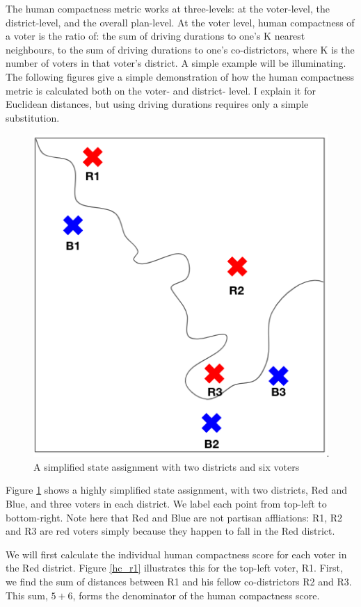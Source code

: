 \documentclass[]{article}
\begin{document}
The human compactness metric works at three-levels: at the voter-level,
the district-level, and the overall plan-level. At the voter level,
human compactness of a voter is the ratio of: the sum of driving
durations to one's K nearest neighbours, to the sum of driving durations
to one's co-districtors, where K is the number of voters in that voter's
district. A simple example will be illuminating. The following figures
give a simple demonstration of how the human compactness metric is
calculated both on the voter- and district- level. I explain it for
Euclidean distances, but using driving durations requires only a simple
substitution.

\begin{figure}
\centering
\includegraphics{img/human_compactness_1.png}
\caption{A simplified state assignment with two districts and six voters
\label{hc_demo}}
\end{figure}

Figure \ref{hc_demo} shows a highly simplified state assignment, with
two districts, Red and Blue, and three voters in each district. We label
each point from top-left to bottom-right. Note here that Red and Blue
are not partisan affliations: R1, R2 and R3 are red voters simply
because they happen to fall in the Red district.

We will first calculate the individual human compactness score for each
voter in the Red district. Figure \ref{hc_r1} illustrates this for the
top-left voter, R1. First, we find the sum of distances between R1 and
his fellow co-districtors R2 and R3. This sum, \(5 + 6\), forms the
denominator of the human compactness score.
\end{document}
